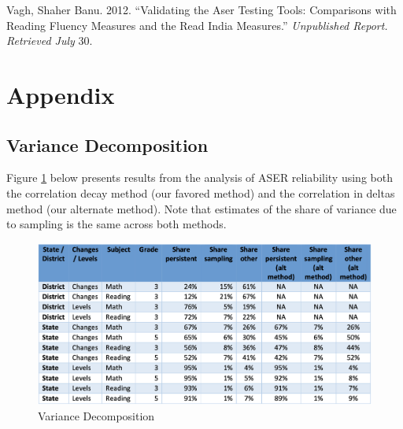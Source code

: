 \documentclass[
  11pt,
]{article}
\begin{document}
\leavevmode\hypertarget{ref-vagh2012validating}{}%
Vagh, Shaher Banu. 2012. ``Validating the Aser Testing Tools: Comparisons with Reading Fluency Measures and the Read India Measures.'' \emph{Unpublished Report. Retrieved July} 30.

\newpage

\hypertarget{appendix}{%
\section{Appendix}\label{appendix}}

\hypertarget{variance-decomposition}{%
\subsection{Variance Decomposition}\label{variance-decomposition}}

Figure \ref{fig:variance} below presents results from the analysis of ASER reliability using both the correlation decay method (our favored method) and the correlation in deltas method (our alternate method). Note that estimates of the share of variance due to sampling is the same across both methods.

\begin{figure}

{\centering \includegraphics[width=0.8\linewidth]{variance_decomp} 

}

\caption{Variance Decomposition}\label{fig:variance}
\end{figure}
\end{document}
